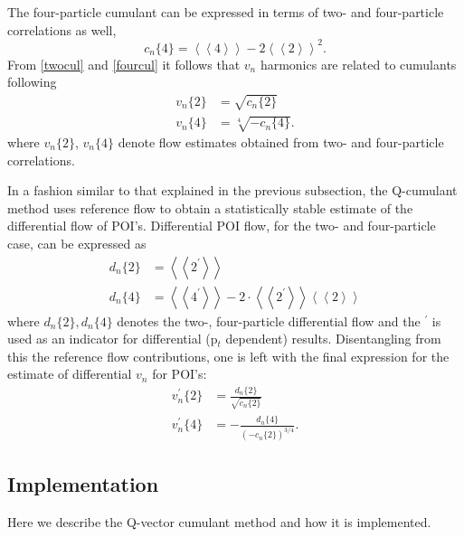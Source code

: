 \documentclass[a5paper]{book}
\numberwithin{equation}{subsection}
\begin{document}
	The four-particle cumulant can be expressed in terms of two- and four-particle correlations as well,
	\begin{equation}\label{fourcul}
		c_n\{4\} = \left< \left< 4 \right> \right> - 2 \left< \left< 2 \right> \right>^2.
	\end{equation}
	From \ref{twocul} and \ref{fourcul} it follows that $v_n$ harmonics are related to cumulants following
	\begin{align}\label{refFlowFromCumulants2nd}
		v_n\{2\} & = \sqrt{c_n\{2\}}                \\
		v_n\{4\} & = \sqrt[4]{-c_n\{4\}} \nonumber. 
	\end{align}
	where $v_n\{2\}$, $v_n\{4\}$ denote flow estimates obtained from two- and four-particle correlations.
		
	In a fashion similar to that explained in the previous subsection, the Q-cumulant method uses reference flow to obtain a statistically stable estimate of the differential flow of POI's. Differential POI flow, for the two- and four-particle case, can be expressed as
	\begin{align}
		d_n\{2\} & = \left< \left< 2^{\prime} \right> \right>                                                                                            \\
		d_n\{4\} & = \left< \left< 4^{\prime} \right> \right> - 2\cdotp \left< \left< 2^{\prime} \right> \right>\left< \left< 2 \right> \right>\nonumber 
	\end{align}
	where $d_n\{2\}, d_n\{4\}$ denotes the two-, four-particle differential flow and the $^{\prime}$ is used as an indicator for differential (p$_t$ dependent) results. Disentangling from this the reference flow contributions, one is left with the final expression for the estimate of differential $v_n$ for POI's:
	\begin{align}
		v_n^{\prime}\{2\} & = \frac{d_n\{2\}}{\sqrt{c_n\{2\}}}               \\
		v_n^{\prime}\{4\} & = - \frac{d_n\{4\}}{(-c_n\{2\})^{3/4}}.\nonumber 
	\end{align}
		
	\subsection{Implementation}
		
	Here we describe the Q-vector cumulant method and how it is implemented.
		
\end{document}
